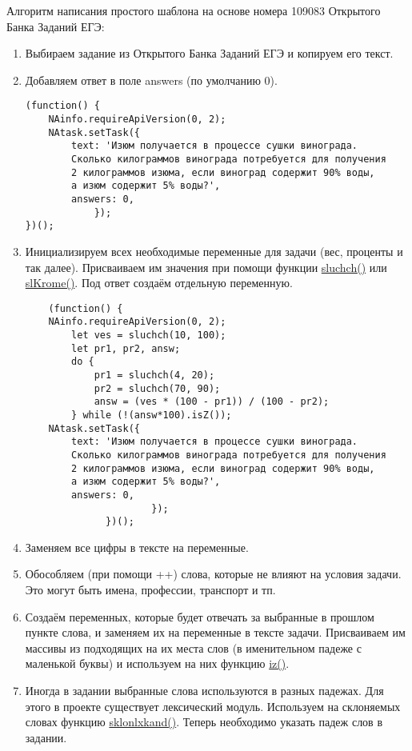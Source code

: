 Алгоритм написания простого шаблона на основе номера 109083 Открытого Банка Заданий ЕГЭ:%
\begin{enumerate}
    \item Выбираем задание из Открытого Банка Заданий ЕГЭ и копируем его текст.
    \item Добавляем ответ в поле answers (по умолчанию 0).
          \begin{verbatim}
(function() {
	NAinfo.requireApiVersion(0, 2);
    NAtask.setTask({
        text: 'Изюм получается в процессе сушки винограда. 
        Сколько килограммов винограда потребуется для получения 
        2 килограммов изюма, если виноград содержит 90% воды,
        а изюм содержит 5% воды?',
        answers: 0,
            });
})();
        \end{verbatim}
    \item Инициализируем всех необходимые переменные для задачи (вес, проценты и так далее).
          Присваиваем им значения при помощи функции \hyperlink{sluchch}{sluchch()} или
          \hyperlink{slKrome}{slKrome()}. Под ответ создаём отдельную переменную.
          \begin{verbatim}     
    (function() {
    NAinfo.requireApiVersion(0, 2);
        let ves = sluchch(10, 100);
        let pr1, pr2, answ;
        do {
            pr1 = sluchch(4, 20);
            pr2 = sluchch(70, 90);
            answ = (ves * (100 - pr1)) / (100 - pr2);
        } while (!(answ*100).isZ());
    NAtask.setTask({
        text: 'Изюм получается в процессе сушки винограда.
        Сколько килограммов винограда потребуется для получения
        2 килограммов изюма, если виноград содержит 90% воды,
        а изюм содержит 5% воды?',
        answers: 0,
                      });
              })();
            \end{verbatim}
    \item Заменяем все цифры в тексте на переменные.
    \item Обособляем (при помощи ++) слова, которые не влияют на условия задачи. Это могут быть имена, профессии, транспорт и тп.
    \item Создаём переменных, которые будет отвечать за выбранные в прошлом пункте слова, и заменяем их на переменные в тексте задачи.
          Присваиваем им массивы из подходящих на их места слов (в именительном падеже с маленькой буквы) и используем на них функцию \hyperlink{iz}{iz()}.
    \item Иногда в задании выбранные слова используются в разных падежах. Для этого в проекте существует лексический модуль. Используем на склоняемых словах функцию \hyperlink{sklonlxkand}{sklonlxkand()}. Теперь необходимо указать падеж слов в задании.

\end{enumerate}
